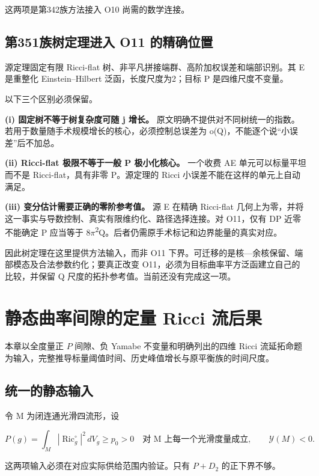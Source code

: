 \documentclass[UTF8,11pt,openany,oneside,fontset=none]{ctexbook}
\begin{document}
这两项是第342族方法接入 O10 尚需的数学连接。

\section{第351族树定理进入 O11 的精确位置}\label{ch6:ux7b2c351ux65cfux6811ux5b9aux7406ux8fdbux5165-o11-ux7684ux7cbeux786eux4f4dux7f6e}

源定理固定有限 Ricci-flat 树、非平凡拼接端群、高阶加权误差和端部识别。其 E 是重整化 Einstein--Hilbert 泛函，长度尺度为2；目标 P 是四维尺度不变量。

以下三个区别必须保留。

\textbf{(i) 固定树不等于树复杂度可随 j 增长。} 原文明确不提供对不同树统一的指数。若用于数量随手术规模增长的核心，必须控制总误差为 o(Q)，不能逐个说``小误差''后不加总。

\textbf{(ii) Ricci-flat 极限不等于一般 P 极小化核心。} 一个收费 AE 单元可以标量平坦而不是 Ricci-flat，具有非零 P。源定理的 Ricci 小误差不能在这样的单元上自动满足。

\textbf{(iii) 变分估计需要正确的零阶参考值。} 源 E 在精确 Ricci-flat 几何上为零，并将这一事实与导数控制、真实有限维约化、路径选择连接。对 O11，仅有 DP 近零不能确定 P 应当等于 8\(\pi\)\textsuperscript{2}Q。后者仍需原手术标记和边界能量的真实对应。

因此树定理在这里提供方法输入，而非 O11 下界。可迁移的是核---余核保留、端部模态及合法参数约化；要真正改变 O11，必须为目标曲率平方泛函建立自己的比较，并保留 Q 尺度的拓扑参考值。当前还没有完成这一项。


\chapter{静态曲率间隙的定量 Ricci 流后果}\label{chapter:7}
本章以全度量正 \(P\) 间隙、负 Yamabe 不变量和明确列出的四维 Ricci 流延拓命题为输入，完整推导标量阈值时间、历史峰值增长与原平衡族的时间尺度。\cite{R07,OAIFlow,Ishida}

\section{统一的静态输入}\label{ch7:ux7edfux4e00ux7684ux9759ux6001ux8f93ux5165}

令 M 为闭连通光滑四流形，设

\[
 P(g)=\int_M|\operatorname{Ric}^{\circ}_g|^2\,dV_g\ge p_0>0
 \quad\text{对 M 上每一个光滑度量成立},
 \qquad \mathcal Y(M)<0.
\]

这两项输入必须在对应实际供给范围内验证。只有 \(P+D_2\) 的正下界不够。
\end{document}

